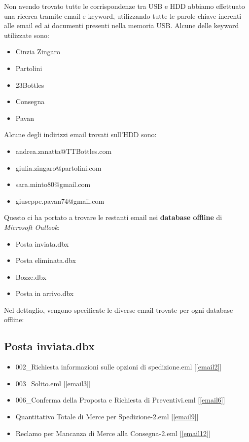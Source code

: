 Non avendo trovato tutte le corrispondenze tra USB e HDD abbiamo effettuato una ricerca tramite email e keyword, utilizzando tutte le parole chiave inerenti alle email ed ai documenti presenti nella memoria USB. Alcune delle keyword utilizzate sono:
\begin{itemize}
    \item Cinzia Zingaro
    \item Partolini
    \item 23Bottles
    \item Consegna
    \item Pavan
\end{itemize}
Alcune degli indirizzi email trovati sull'HDD sono:
\begin{itemize}
    \item andrea.zanatta@TTBottles.com
    \item giulia.zingaro@partolini.com
    \item sara.minto80@gmail.com
    \item giuseppe.pavan74@gmail.com
\end{itemize}
Questo ci ha portato a trovare le restanti email nei \textbf{database offline} di \textit{Microsoft Outlook}:
\begin{itemize}
    \item Posta inviata.dbx
    \item Posta eliminata.dbx
    \item Bozze.dbx
    \item Posta in arrivo.dbx
\end{itemize}

\pagebreak

Nel dettaglio, vengono specificate le diverse email trovate per ogni database offline:
\subsection{Posta inviata.dbx}
\begin{itemize}
    \item 002\_Richiesta informazioni sulle opzioni di spedizione.eml [\ref{email2}]
    \item 003\_Solito.eml [\ref{email3}]
    \item 006\_Conferma della Proposta e Richiesta di Preventivi.eml [\ref{email6}]
    \item Quantitativo Totale di Merce per Spedizione-2.eml [\ref{email9}]
    \item Reclamo per Mancanza di Merce alla Consegna-2.eml [\ref{email12}]
\end{itemize}

